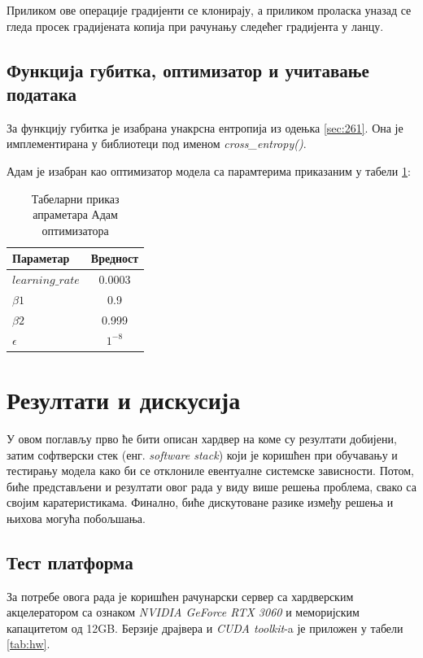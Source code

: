 \documentclass[a4paper, 12pt, master, utf8]{etf}
\begin{document}
Приликом ове операције градијенти се клонирају, а приликом проласка уназад се гледа просек градијената копија при рачунању следећег градијента у ланцу.

\section{Функција губитка, оптимизатор и учитавање података}
\label{sec:43}

За функцију губитка је изабрана унакрсна ентропија из одењка \ref{sec:261}. Она је имплементирана у библиотеци под именом \textit{cross\_entropy()}.
\newline

Адам је изабран као оптимизатор модела са парамтерима приказаним у табели \ref{tab:adam}:

\begin{table}[H]
    \centering
    \begin{tabular}{l | c}
    \hline
    Параметар & Вредност\\
    \hline
        $learning\_rate$ & 0.0003\\
        $\beta1$ & 0.9\\
        $\beta2$ & 0.999\\
        $\epsilon$ & $1^{-8}$\\
    \end{tabular}
    \caption{Табеларни приказ апраметара Адам оптимизатора}
    \label{tab:adam}
\end{table}



\chapter{Резултати и дискусија}
\label{sec:5}

У овом поглављу прво ће бити описан хардвер на коме су резултати добијени, 
затим софтверски стек (енг. \textit{software stack}) који је коришћен при 
обучавању и тестирању модела како би се отклониле евентуалне системске зависности. Потом, 
биће представљени и резултати овог рада у виду више решења проблема, свако са 
својим каратеристикама. Финално, биће дискутоване разике између решења и њихова могућа побољшања.

\section{Тест платформа}
\label{sec:51}

За потребе овога рада је коришћен рачунарски сервер са хардверским акцелератором са ознаком \textit{NVIDIA GeForce RTX 3060} и меморијским капацитетом од 12GB.
Берзије драјвера и \textit{CUDA toolkit}-a је приложен у табели \ref{tab:hw}.
\newline
\end{document}
